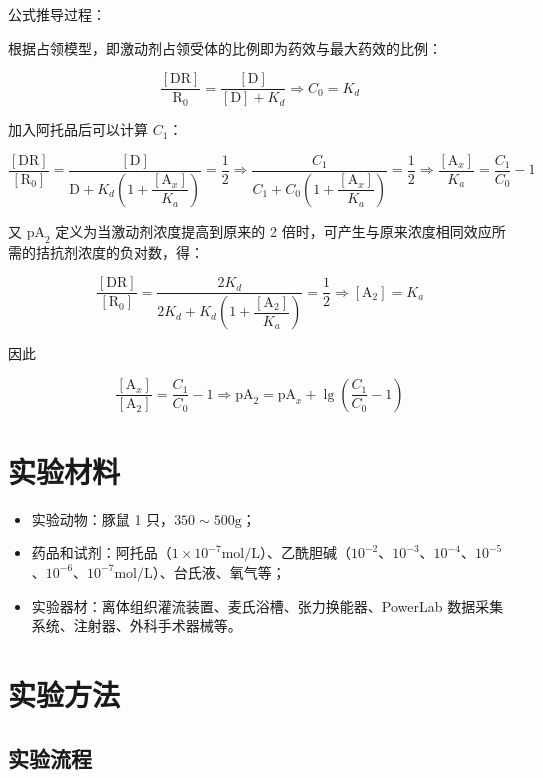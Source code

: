 \documentclass[UTF8]{ctexart}
\begin{document}
公式推导过程：

根据占领模型，即激动剂占领受体的比例即为药效与最大药效的比例：

$$
    \frac{[\text{DR}]}{\text{R}_0}=\frac{[\text{D}]}{[\text{D}]+K_d}\Rightarrow C_0=K_d
$$

加入阿托品后可以计算 $C_1$：

$$
    \frac{[\text{DR}]}{[\text{R}_0]}=\dfrac{[\text{D}]}{\text{D}+K_d\left(1+\dfrac{[\text{A}_x]}{K_a}\right)}=\frac{1}{2}\Rightarrow\dfrac{C_1}{C_1+C_0\left(1+\dfrac{[\text{A}_x]}{K_a}\right)}=\frac{1}{2}\Rightarrow\frac{[\text{A}_x]}{K_a}=\frac{C_1}{C_0}-1
$$

又 $\text{pA}_2$ 定义为当激动剂浓度提高到原来的 2 倍时，可产生与原来浓度相同效应所需的拮抗剂浓度的负对数，得：

$$
    \frac{[\text{DR}]}{[\text{R}_0]}=\dfrac{2K_d}{2K_d+K_d\left(1+\dfrac{[\text{A}_2]}{K_a}\right)}=\frac{1}{2}\Rightarrow [\text{A}_2]=K_a
$$

因此

$$
    \frac{[\text{A}_x]}{[\text{A}_2]}=\frac{C_1}{C_0}-1\Rightarrow\text{pA}_2=\text{pA}_x+\lg\left(\frac{C_1}{C_0}-1\right)
$$

\section{实验材料}

\begin{itemize}
    \item 实验动物：豚鼠 1 只，$350\sim 500\text{g}$；
    \item 药品和试剂：阿托品（$1\times10^{-7}\text{mol}/\text{L}$）、乙酰胆碱（$10^{-2}$、$10^{-3}$、$10^{-4}$、$10^{-5}$、$10^{-6}$、$10^{-7}\text{mol}/\text{L}$）、台氏液、氧气等；
    \item 实验器材：离体组织灌流装置、麦氏浴槽、张力换能器、PowerLab 数据采集系统、注射器、外科手术器械等。
\end{itemize}

\section{实验方法}

\subsection{实验流程}
\end{document}
